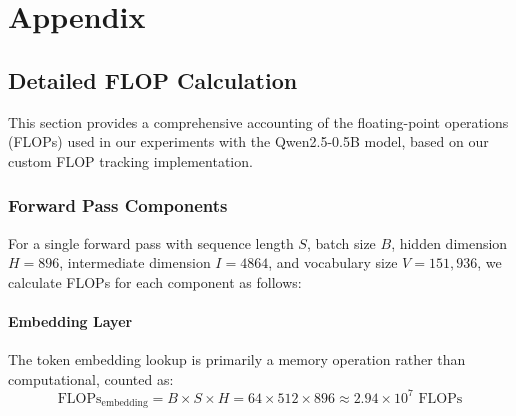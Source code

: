 \documentclass{article}
\begin{document}
\section*{Appendix}
\subsection*{Detailed FLOP Calculation}

This section provides a comprehensive accounting of the floating-point operations (FLOPs) used in our experiments with the Qwen2.5-0.5B model, based on our custom FLOP tracking implementation.

\subsubsection*{Forward Pass Components}

For a single forward pass with sequence length $S$, batch size $B$, hidden dimension $H=896$, intermediate dimension $I=4864$, and vocabulary size $V=151,936$, we calculate FLOPs for each component as follows:

\paragraph{Embedding Layer}
The token embedding lookup is primarily a memory operation rather than computational, counted as:
\begin{equation}
\text{FLOPs}_{\text{embedding}} = B \times S \times H = 64 \times 512 \times 896 \approx 2.94 \times 10^7 \text{ FLOPs}
\end{equation}
\end{document}
